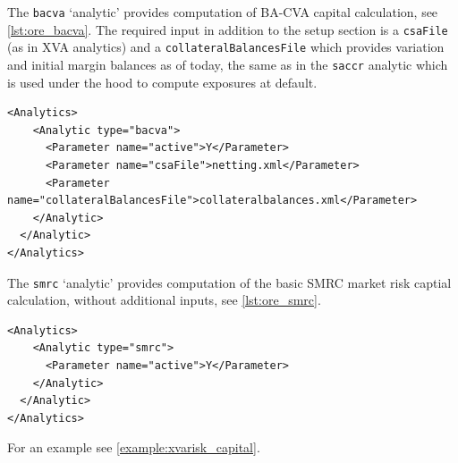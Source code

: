 The {\tt bacva} `analytic' provides computation of BA-CVA capital calculation, see \ref{lst:ore_bacva}.
The required input in addition to the setup section is a {\tt csaFile} (as in XVA analytics) and a {\tt collateralBalancesFile}
which provides variation and initial margin balances as of today, the same as in the {\tt saccr} analytic which is
used under the hood to compute exposures at default.

\begin{listing}[H]
\begin{verbatim}
<Analytics>
    <Analytic type="bacva">
      <Parameter name="active">Y</Parameter>
      <Parameter name="csaFile">netting.xml</Parameter>
      <Parameter name="collateralBalancesFile">collateralbalances.xml</Parameter>
    </Analytic>
  </Analytic>
</Analytics>
\end{verbatim}
\caption{ORE analytic: BA-CVA}
\label{lst:ore_bacva}
\end{listing}

\medskip The {\tt smrc} `analytic' provides computation of the basic SMRC market risk captial calculation, without additional inputs,
see \ref{lst:ore_smrc}.

\begin{listing}[H]
\begin{verbatim}
<Analytics>
    <Analytic type="smrc">
      <Parameter name="active">Y</Parameter>
    </Analytic>
  </Analytic>
</Analytics>
\end{verbatim}
\caption{ORE analytic: SMRC}
\label{lst:ore_smrc}
\end{listing}

For an example see \ref{example:xvarisk_capital}.
